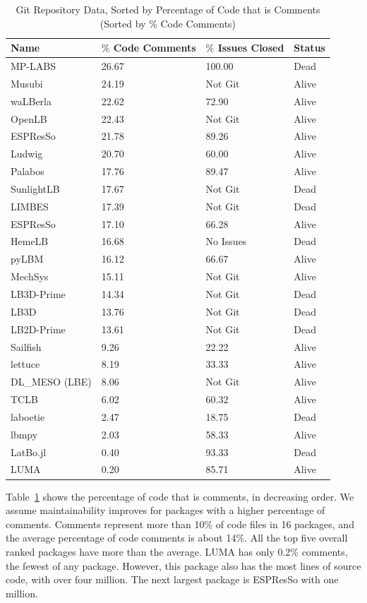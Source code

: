 \documentclass[final, 3p, times, authoryear]{elsarticle}
\newcommand{\esp}{ESPResSo\nolinebreak\hspace{-.05em}\raisebox{.4ex}{\small\bf
+}\nolinebreak\hspace{-.10em}\raisebox{.4ex}{\small\bf +}}
\begin{document}
\begin{table}[ht!]
	\begin{center}
		\begin{tabular}{ p{3.5cm}p{3.5cm}p{3.5cm}p{2.5cm} }
			\toprule
			Name & $\%$ Code Comments & $\%$ Issues Closed & Status\\
			\midrule
			MP-LABS & 26.67 & 100.00 & Dead\\
			Musubi & 24.19 & Not Git & Alive\\
			waLBerla & 22.62 & 72.90 & Alive\\
			OpenLB & 22.43 & Not Git & Alive\\
			ESPResSo & 21.78 & 89.26 & Alive\\
			Ludwig& 20.70 & 60.00 & Alive\\
			Palabos & 17.76 & 89.47 & Alive\\
			SunlightLB & 17.67 & Not Git & Dead\\
			LIMBES & 17.39 & Not Git & Dead\\
			\esp & 17.10 & 66.28 & Alive\\
			HemeLB & 16.68 & No Issues & Dead\\
			pyLBM & 16.12 & 66.67 & Alive\\
			MechSys & 15.11 & Not Git & Alive\\
			LB3D-Prime & 14.34 & Not Git & Dead\\
			LB3D & 13.76 & Not Git & Dead\\
			LB2D-Prime & 13.61 & Not Git & Dead\\
			Sailfish & 9.26 & 22.22 & Alive\\
			lettuce & 8.19 & 33.33 & Alive\\
			DL\_MESO (LBE) & 8.06 & Not Git & Alive\\
			TCLB & 6.02 & 60.32 & Alive\\
			laboetie & 2.47 & 18.75 & Dead\\	
			lbmpy& 2.03 & 58.33 & Alive\\	
			LatBo.jl & 0.40 & 93.33 & Dead\\
			LUMA& 0.20 & 85.71 & Alive\\
			\bottomrule
		\end{tabular}
		\caption{Git Repository Data, Sorted by Percentage of Code that is
			Comments (Sorted by $\%$ Code Comments)} \label{gitrepodata}
	\end{center}
\end{table}
		
Table~\ref{gitrepodata} shows the percentage of code that is comments, in
decreasing order. We assume maintainability improves for packages with a higher
percentage of comments. Comments represent more than 10\% of code files in 16
packages, and the average percentage of code comments is about 14\%. All the top
five overall ranked packages have more than the average. LUMA has only 0.2\%
comments, the fewest of any package. However, this package also has the most
lines of source code, with over four million. The next largest package is \esp{}
with one million.
\end{document}
